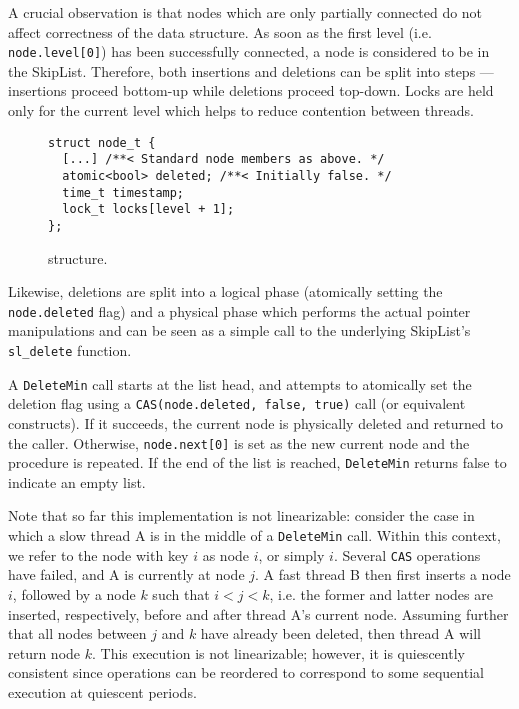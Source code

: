 A crucial observation is that nodes which are only partially connected
do not affect correctness of the data structure. As soon as the first level (i.e. \lstinline|node.level[0]|)
has been successfully connected, a node is considered to be in the SkipList.
Therefore, both insertions and deletions can be split into steps --- insertions
proceed bottom-up while deletions proceed top-down. Locks are held only for the current level
which helps to reduce contention between threads.

\begin{figure}[ht]
\begin{lstlisting}
struct node_t {
  [...] /**< Standard node members as above. */
  atomic<bool> deleted; /**< Initially false. */
  time_t timestamp;
  lock_t locks[level + 1];
};
\end{lstlisting}
\caption{\citeauthor{shavit2000skiplist} structure.}
\label{fig:shavitsl}
\end{figure}

Likewise, deletions are split into a logical phase (atomically setting the \lstinline|node.deleted|
flag) and a physical phase which performs the actual pointer manipulations and can be seen as a simple
call to the underlying SkipList's \lstinline|sl_delete| function.

A \lstinline|DeleteMin| call starts at the list head, and attempts to atomically set
the deletion flag using a \lstinline|CAS(node.deleted, false, true)| call (or equivalent constructs).
If it succeeds, the current node is physically deleted and returned to the caller. Otherwise,
\lstinline|node.next[0]| is set as the new current node and the procedure is repeated.
If the end of the list is reached, \lstinline|DeleteMin| returns false to indicate an empty list.


Note that so far this implementation is not linearizable: consider the case in which a
slow thread A is in the middle of a \lstinline|DeleteMin| call. Within this context, we refer to
the node with key $i$ as node $i$, or simply $i$. Several \lstinline|CAS|
operations have failed, and A is currently at node $j$.
A fast thread B then first inserts a node $i$, followed by a node $k$ such that
$i < j < k$, i.e. the former and latter nodes are inserted, respectively, before and after
thread A's current node. Assuming further that all nodes between $j$ and $k$ have already
been deleted, then thread A will return node $k$. This execution is not linearizable; however,
it is quiescently consistent since operations can be reordered to correspond to some sequential
execution at quiescent periods.

